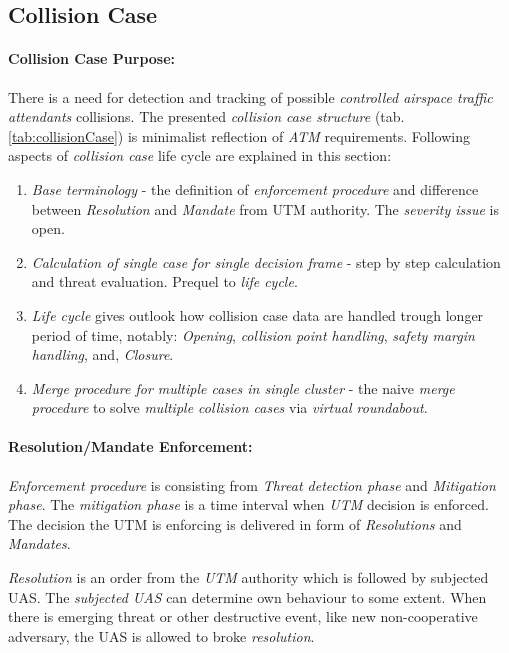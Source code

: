 \subsection{Collision Case}\label{sec:collisionCase}


\paragraph{Collision Case Purpose:} There is a need for detection and tracking of possible \emph{controlled airspace traffic attendants} collisions.  The presented \emph{collision case structure} (tab. \ref{tab:collisionCase}) is minimalist reflection of \emph{ATM} requirements. Following aspects of  \emph{collision case} life cycle are explained in this section:
\begin{enumerate}
    \item \emph{Base terminology} - the definition of \emph{enforcement procedure} and difference between \emph{Resolution} and \emph{Mandate} from UTM authority. The \emph{severity issue} is open.
    
    \item \emph{Calculation of single case for single decision frame} - step by step calculation and threat evaluation. Prequel to \emph{life cycle}.
    
    \item \emph{Life cycle} gives outlook how collision case data are handled trough longer period of time, notably: \emph{Opening}, \emph{collision point handling}, \emph{safety margin handling}, and, \emph{Closure}.
    
    \item \emph{Merge procedure for multiple cases in single cluster} - the naive \emph{merge procedure} to solve \emph{multiple collision cases} via \emph{virtual roundabout}.
\end{enumerate}


\paragraph{Resolution/Mandate Enforcement:}
\emph{Enforcement procedure} is consisting from \emph{Threat detection phase} and \emph{Mitigation phase}. The \emph{mitigation phase} is a time interval when \emph{UTM} decision is enforced. The decision the UTM is enforcing is delivered in form of \emph{Resolutions} and \emph{Mandates}.


\emph{Resolution} is an order from the \emph{UTM} authority which is followed by subjected UAS. The \emph{subjected UAS} can determine own behaviour to some extent. When there is emerging threat or other destructive event, like new non-cooperative adversary, the UAS is allowed to broke \emph{resolution}.  

